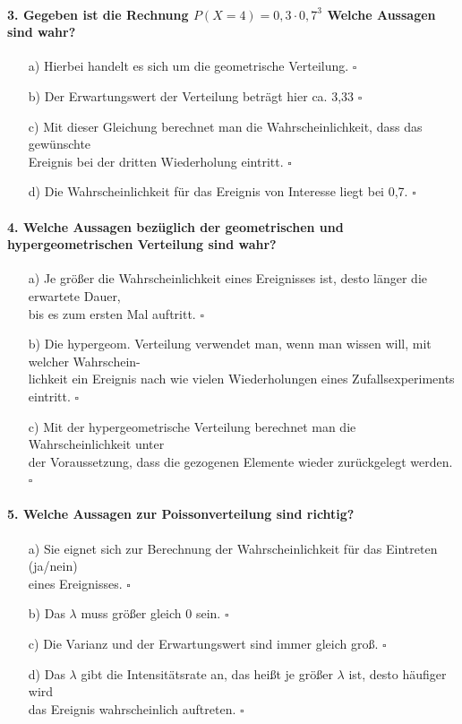 \documentclass[a4paper]{article}
\begin{document}
\paragraph{3. Gegeben ist die Rechnung $P(X=4) = 0,3 \cdot 0,7^3$ Welche Aussagen sind wahr?}
\begin{itemize}
    \item[a)] Hierbei handelt es sich um die geometrische Verteilung. \hfill $\square$
    \item[b)] Der Erwartungswert der Verteilung beträgt hier ca. 3,33 \hfill $\square$
    \item[c)] Mit dieser Gleichung berechnet man die Wahrscheinlichkeit, dass das gewünschte\\ Ereignis bei der dritten Wiederholung eintritt. \hfill $\square$
    \item[d)] Die Wahrscheinlichkeit für das Ereignis von Interesse liegt bei 0,7. \hfill $\square$
\end{itemize}
    
\paragraph{4. Welche Aussagen bezüglich der geometrischen und hypergeometrischen Verteilung sind wahr?}
\begin{itemize}
    \item[a)] Je größer die Wahrscheinlichkeit eines Ereignisses ist, desto länger die erwartete Dauer, \\ bis es zum ersten Mal auftritt. \hfill $\square$
    \item[b)] Die hypergeom. Verteilung verwendet man, wenn man wissen will, mit welcher Wahrschein-\\lichkeit ein Ereignis nach wie vielen Wiederholungen eines Zufallsexperiments eintritt. \hfill $\square$
    \item[c)] Mit der hypergeometrische Verteilung berechnet man die Wahrscheinlichkeit unter\\ der Voraussetzung, dass die gezogenen Elemente wieder zurückgelegt werden. \hfill $\square$
\end{itemize}
    
\paragraph{5. Welche Aussagen zur Poissonverteilung sind richtig?}
\begin{itemize}
    \item[a)] Sie eignet sich zur Berechnung der Wahrscheinlichkeit für das Eintreten (ja/nein)\\eines Ereignisses. \hfill $\square$
    \item[b)] Das $\lambda$ muss größer gleich 0 sein. \hfill $\square$
    \item[c)] Die Varianz und der Erwartungswert sind immer gleich groß. \hfill $\square$
    \item[d)] Das $\lambda$ gibt die Intensitätsrate an, das heißt je größer $\lambda$ ist, desto häufiger wird \\das Ereignis wahrscheinlich auftreten. \hfill $\square$
\end{itemize}
\end{document}
